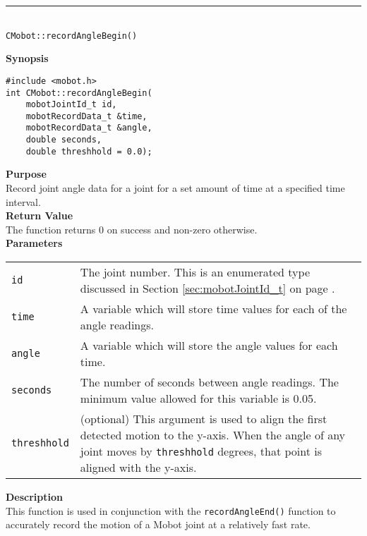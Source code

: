 \noindent
\vspace{5pt}
\rule{4.5in}{0.015in}\\
\noindent
{\LARGE \texttt{CMobot::recordAngleBegin()}}\\
{}

\noindent
{\bf Synopsis}
\vspace{-8pt}
\begin{verbatim}
#include <mobot.h>
int CMobot::recordAngleBegin(
    mobotJointId_t id, 
    mobotRecordData_t &time, 
    mobotRecordData_t &angle, 
    double seconds, 
    double threshhold = 0.0);
\end{verbatim}

\noindent
{\bf Purpose}\\
Record joint angle data for a joint for a set amount of time at a specified time interval.\\

\noindent
{\bf Return Value}\\
The function returns 0 on success and non-zero otherwise.\\

\noindent
{\bf Parameters}\\
\vspace{-0.1in}
\begin{description}
\item               
\begin{tabular}{p{15 mm}p{145 mm}}
\texttt{id} & The joint number. This is an enumerated type 
discussed in Section \ref{sec:mobotJointId_t} on page
\pageref{sec:mobotJointId_t}.\\
\texttt{time} & A variable which will store time values for each of the angle readings. \\
\texttt{angle} & A variable which will store the angle values for each time. \\
\texttt{seconds} & The number of seconds between angle readings. The minimum value allowed for
this variable is 0.05. \\
\texttt{threshhold} & (optional) This argument is used to align the first
detected motion to the y-axis. When the angle of any joint moves by
\texttt{threshhold} degrees, that point is aligned with the y-axis.
\end{tabular}
\end{description}

\noindent
{\bf Description}\\
This function is used in conjunction with the \texttt{recordAngleEnd()}
function to accurately record the motion of a Mobot joint at a relatively fast
rate. 

